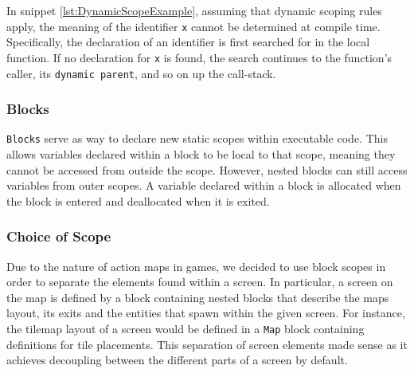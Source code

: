 In snippet \ref{lst:DynamicScopeExample}, assuming that dynamic scoping rules apply, the meaning of the identifier \texttt{x} cannot be determined at compile time.
Specifically, the declaration of an identifier is first searched for in the local function.
If no declaration for \texttt{x} is found, the search continues to the function's caller, its \texttt{dynamic parent}, and so on up the call-stack\cite{sebesta_concepts_2016}.

\subsubsection{Blocks}
\texttt{Blocks} serve as way to declare new static scopes within executable code.
This allows variables declared within a block to be local to that scope, meaning they cannot be accessed from outside the scope.
However, nested blocks can still access variables from outer scopes.
A variable declared within a block is allocated when the block is entered and deallocated when it is exited\cite{sebesta_concepts_2016}.

\subsubsection{Choice of Scope}
Due to the nature of action maps in games, we decided to use block scopes in order to separate the elements found within a screen.
In particular, a screen on the map is defined by a block containing nested blocks that describe the maps layout, its exits and the entities that spawn within the given screen.
For instance, the tilemap layout of a screen would be defined in a \texttt{Map} block containing definitions for tile placements.
This separation of screen elements made sense as it achieves decoupling between the different parts of a screen by default.
